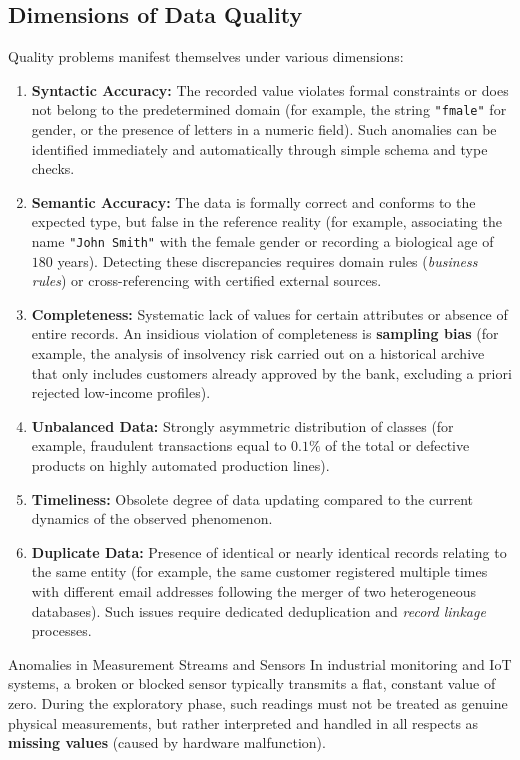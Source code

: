 \subsection{Dimensions of Data Quality}
Quality problems manifest themselves under various dimensions:
\begin{enumerate}
    \item \textbf{Syntactic Accuracy:} The recorded value violates formal constraints or does not belong to the predetermined domain (for example, the string \texttt{"fmale"} for gender, or the presence of letters in a numeric field). Such anomalies can be identified immediately and automatically through simple schema and type checks.
    \item \textbf{Semantic Accuracy:} The data is formally correct and conforms to the expected type, but false in the reference reality (for example, associating the name \texttt{"John Smith"} with the female gender or recording a biological age of $180$ years). Detecting these discrepancies requires domain rules (\textit{business rules}) or cross-referencing with certified external sources.
    \item \textbf{Completeness:} Systematic lack of values for certain attributes or absence of entire records. An insidious violation of completeness is \textbf{sampling bias} (for example, the analysis of insolvency risk carried out on a historical archive that only includes customers already approved by the bank, excluding a priori rejected low-income profiles).
    \item \textbf{Unbalanced Data:} Strongly asymmetric distribution of classes (for example, fraudulent transactions equal to $0.1\%$ of the total or defective products on highly automated production lines).
    \item \textbf{Timeliness:} Obsolete degree of data updating compared to the current dynamics of the observed phenomenon.
    \item \textbf{Duplicate Data:} Presence of identical or nearly identical records relating to the same entity (for example, the same customer registered multiple times with different email addresses following the merger of two heterogeneous databases). Such issues require dedicated deduplication and \textit{record linkage} processes.
\end{enumerate}

\begin{noteblock}{Anomalies in Measurement Streams and Sensors}
In industrial monitoring and IoT systems, a broken or blocked sensor typically transmits a flat, constant value of zero. During the exploratory phase, such readings must not be treated as genuine physical measurements, but rather interpreted and handled in all respects as \textbf{missing values} (caused by hardware malfunction).
\end{noteblock}

